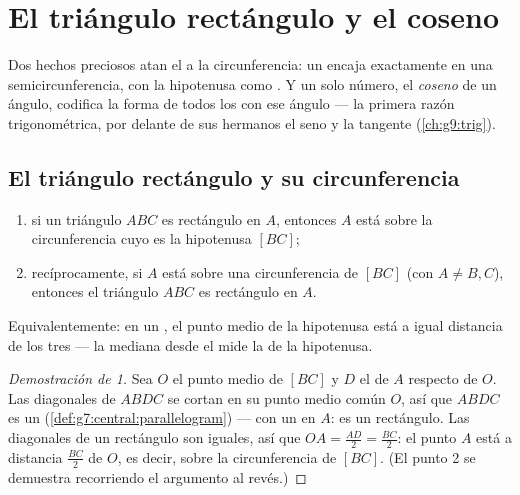 \chapter{El triángulo rectángulo y el coseno}\label{ch:g8:cosine}

Dos hechos preciosos atan el  a la circunferencia: un  encaja exactamente en una semicircunferencia, con la hipotenusa como
. Y un solo número, el \emph{coseno} de un ángulo, codifica la
forma de todos los  con ese ángulo --- la primera
razón trigonométrica, por delante de sus hermanos el seno y la tangente
(\cref{ch:g9:trig}).

\section{El triángulo rectángulo y su circunferencia}

\begin{theorem}\label{thm:g8:cosine:circle}
\begin{enumerate}
  \item si un triángulo $ABC$ es rectángulo en $A$, entonces $A$ está sobre
        la circunferencia cuyo  es la hipotenusa $[BC]$;
  \item recíprocamente, si $A$ está sobre una circunferencia de  $[BC]$ (con
        $A \neq B, C$), entonces el triángulo $ABC$ es rectángulo en
        $A$.
\end{enumerate}
Equivalentemente: en un , el punto medio de la hipotenusa está
a igual distancia de los tres  --- la mediana desde el
 mide la  de la hipotenusa.
\end{theorem}

\begin{proof}[Demostración de 1]
Sea $O$ el punto medio de $[BC]$ y $D$ el  de $A$ respecto de
$O$. Las diagonales de $ABDC$ se cortan en su punto medio común $O$, así que
$ABDC$ es un  (\cref{def:g7:central:parallelogram}) ---
con un  en $A$: es un rectángulo. Las diagonales de un
rectángulo son iguales, así que $OA = \frac{AD}{2} = \frac{BC}{2}$: el
punto $A$ está a distancia $\frac{BC}{2}$ de $O$, es decir, sobre la circunferencia
de  $[BC]$. (El punto 2 se demuestra recorriendo el argumento
al revés.)
\end{proof}

